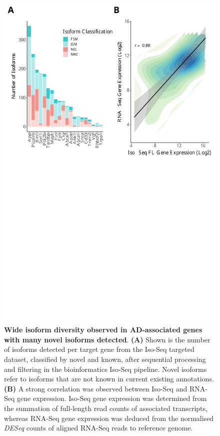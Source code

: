 \begin{figure}[!htp]
	\begin{center}
		\includegraphics[page=1,trim={0 20cm 0 0cm},clip,scale = 0.60]{Figures/ONTvsIsoSeq.pdf}
	\end{center}
	\captionsetup{width=0.95\textwidth}
	\caption[Wide isoform diversity in AD-associated genes from Targeted Sequencing in mouse cortex]%
	{\textbf{Wide isoform diversity observed in AD-associated genes with many novel isoforms detected}. \textbf{(A)} Shown is the number of isoforms detected per target gene from the Iso-Seq targeted dataset, classified by novel and known, after sequential processing and filtering in the bioinformatics Iso-Seq pipeline. Novel isoforms refer to isoforms that are not known in current existing annotations. \textbf{(B)} A strong correlation was observed between Iso-Seq and RNA-Seq gene expression. Iso-Seq gene expression was determined from the summation of full-length read counts of associated transcripts, whereas RNA-Seq gene expression was deduced from the normalised \textit{DESeq} counts of aligned RNA-Seq reads to reference genome\cite{Castanho2020}.}
	\label{fig:isoseq_targeted_finalnumberiso}
\end{figure}

